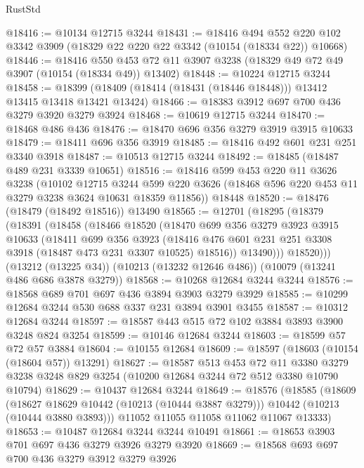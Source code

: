\begin{lexlean}{RustStd}
\begin{coremodule}
@18416 := @10134 @12715 @3244
@18431 := @18416
    @494
    @552
    @220
    @102
    @3342
    @3909
    (@18329 @22 @220 @22 @3342 (@10154 (@18334 @22)) @10668)
@18446 := @18416
    @550
    @453
    @72
    @11
    @3907
    @3238
    (@18329 @49 @72 @49 @3907 (@10154 (@18334 @49)) @13402)
@18448 := @10224 @12715 @3244
@18458 := @18399 (@18409 (@18414 (@18431 (@18446 @18448))) @13412 @13415 @13418 @13421 @13424)
@18466 := @18383 @3912 @697 @700 @436 @3279 @3920 @3279 @3924
@18468 := @10619 @12715 @3244
@18470 := @18468 @486 @436
@18476 := @18470 @696 @356 @3279 @3919 @3915 @10633
@18479 := @18411 @696 @356 @3919
@18485 := @18416 @492 @601 @231 @251 @3340 @3918
@18487 := @10513 @12715 @3244
@18492 := @18485 (@18487 @489 @231 @3339 @10651)
@18516 := @18416
    @599
    @453
    @220
    @11
    @3626
    @3238
    (@10102
      @12715
      @3244
      @599
      @220
      @3626
      (@18468 @596 @220 @453 @11 @3279 @3238 @3624 @10631 @18359 @11856))
    @18448
@18520 := @18476 (@18479 (@18492 @18516)) @13490
@18565 := @12701
    (@18295
      (@18379
        (@18391
          (@18458
            (@18466
              @18520
              (@18470
                @699
                @356
                @3279
                @3923
                @3915
                @10633
                (@18411
                  @699
                  @356
                  @3923
                  (@18416 @476 @601 @231 @251 @3308 @3918 (@18487 @473 @231 @3307 @10525) @18516))
                @13490)))
          @18520)))
    (@13212 (@13225 @34))
    (@10213 (@13232 @12646 @486))
    (@10079 (@13241 @486 @686 @3878 @3279))
@18568 := @10268 @12684 @3244 @3244
@18576 := @18568 @689 @701 @697 @436 @3894 @3903 @3279 @3929
@18585 := @10299 @12684 @3244 @530 @688 @337 @231 @3894 @3901 @3455
@18587 := @10312 @12684 @3244
@18597 := @18587 @443 @515 @72 @102 @3884 @3893 @3900 @3248 @824 @3254
@18599 := @10146 @12684 @3244
@18603 := @18599 @57 @72 @57 @3884
@18604 := @10155 @12684
@18609 := @18597 (@18603 (@10154 (@18604 @57)) @13291)
@18627 := @18587
    @513
    @453
    @72
    @11
    @3380
    @3279
    @3238
    @3248
    @829
    @3254
    (@10200 @12684 @3244 @72 @512 @3380 @10790 @10794)
@18629 := @10437 @12684 @3244
@18649 := @18576
    (@18585
      (@18609
        (@18627 @18629 @10442 (@10213 (@10444 @3887 @3279)))
        @10442
        (@10213 (@10444 @3880 @3893)))
      @11052
      @11055
      @11058
      @11062
      @11067
      @13333)
@18653 := @10487 @12684 @3244 @3244 @10491
@18661 := @18653 @3903 @701 @697 @436 @3279 @3926 @3279 @3920
@18669 := @18568 @693 @697 @700 @436 @3279 @3912 @3279 @3926

\end{coremodule}
\end{lexlean}
